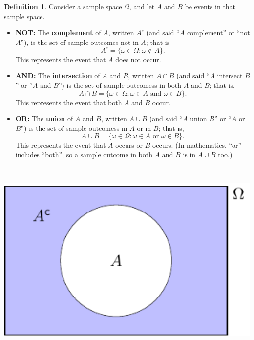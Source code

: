 \documentclass[
  a4paper,
]{book}
\providecommand{\tightlist}{%
  \setlength{\itemsep}{0pt}\setlength{\parskip}{0pt}}
\theoremstyle{definition}
\newtheorem{definition}{Definition}[chapter]
\theoremstyle{definition}
\theoremstyle{definition}
\theoremstyle{definition}
\theoremstyle{remark}
\begin{document}
\begin{definition}

Consider a sample space \(\Omega\), and let \(A\) and \(B\) be events in that sample space.

\begin{itemize}
\tightlist
\item
  \textbf{{NOT:}} The \textbf{complement} of \(A\), written \(A^\mathsf{c}\) (and said ``\(A\) complement'' or ``not \(A\)''), is the set of sample outcomes not in \(A\); that is
  \[ A^\mathsf{c}= \{\omega \in \Omega : \omega \not\in A \} . \]
  This represents the event that \(A\) does not occur.
\item
  \textbf{{AND}:} The \textbf{intersection} of \(A\) and \(B\), written \(A \cap B\) (and said ``\(A\) intersect \(B\)'' or ``\(A\) and \(B\)'') is the set of sample outcomess in both \(A\) and \(B\); that is,\\
  \[ A \cap B = \{\omega \in \Omega : \omega \in A \text{ and } \omega \in B \} . \]
  This represents the event that both \(A\) and \(B\) occur.
\item
  \textbf{{OR:}} The \textbf{union} of \(A\) and \(B\), written \(A \cup B\) (and said ``\(A\) union \(B\)'' or ``\(A\) or \(B\)'') is the set of sample outcomess in \(A\) or in \(B\); that is,
  \[ A \cup B = \{\omega \in \Omega : \omega \in A \text{ or } \omega \in B \} . \]
  This represents the event that \(A\) occurs or \(B\) occurs. (In mathematics, ``or'' includes ``both'', so a sample outcome in both \(A\) and \(B\) is in \(A\cup B\) too.)
\end{itemize}

~

\begin{center}\includegraphics[width=550pt]{math1710_files/figure-latex/venn-not-1} \end{center}


\end{definition}
\end{document}
